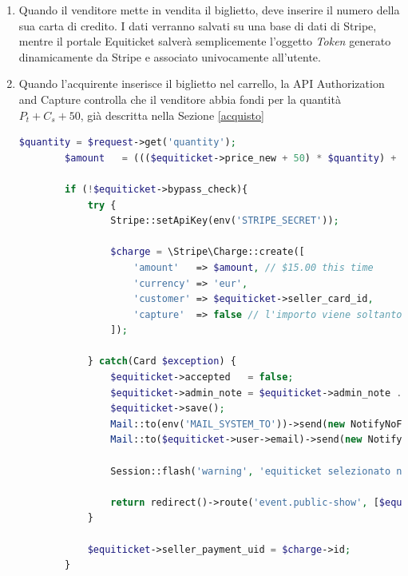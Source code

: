 \begin{enumerate}
\item Quando il venditore mette in vendita il biglietto, deve inserire il numero della sua carta di credito. I dati verranno salvati su una base di dati di Stripe, mentre il portale Equiticket salverà semplicemente l'oggetto \textit{Token} generato dinamicamente da Stripe e associato univocamente all'utente.
\item Quando l'acquirente inserisce il biglietto nel carrello, la API Authorization and Capture controlla che il venditore abbia fondi per la quantità $P_{t} + C_{s} + 50$, già descritta nella Sezione \ref{acquisto}
\begin{lstlisting}[language=PHP, caption={Trattenuta della cifra $P_{t} + C_{s} + 50$ sulla carta del venditore quando l'acquirente inserisce il biglietto nel carrello}]
		$quantity = $request->get('quantity');
		$amount   = ((($equiticket->price_new + 50) * $quantity) + $equiticket->shipping_cost) * 100;

		if (!$equiticket->bypass_check){
			try {
				Stripe::setApiKey(env('STRIPE_SECRET'));

				$charge = \Stripe\Charge::create([
					'amount'   => $amount, // $15.00 this time
					'currency' => 'eur',
					'customer' => $equiticket->seller_card_id,
					'capture'  => false // l'importo viene soltanto trattenuto, non addebitato
				]);

			} catch(Card $exception) {
				$equiticket->accepted   = false;
				$equiticket->admin_note = $equiticket->admin_note . 'ATTENZIONE! biglietto sospeso in data ' . Carbon::now()->format('d-m-Y') . ' a causa di fondi insufficienti sulla carta di credito collegata.';
				$equiticket->save();
				Mail::to(env('MAIL_SYSTEM_TO'))->send(new NotifyNoFoundAvailableToAdmin($equiticket));
				Mail::to($equiticket->user->email)->send(new NotifyNoFoundAvailableToUser($equiticket));

				Session::flash('warning', 'equiticket selezionato non disponibile.');

				return redirect()->route('event.public-show', [$equiticket->event->id]);
			}

			$equiticket->seller_payment_uid = $charge->id;
		}


\end{lstlisting}
\end{enumerate}
